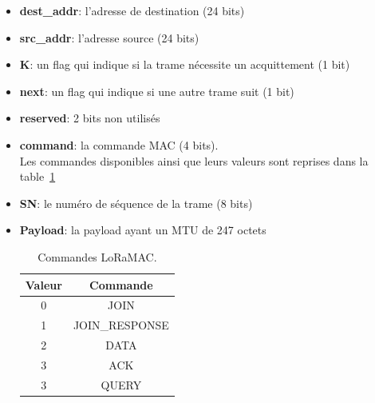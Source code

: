     \begin{itemize}
        \item \textbf{dest\_addr}: l'adresse de destination (24 bits)
        \item \textbf{src\_addr}: l'adresse source (24 bits)
        \item \textbf{K}: un flag  qui indique si la trame nécessite un acquittement (1 bit)
        \item \textbf{next}: un flag qui indique si une autre trame suit (1 bit)
        \item \textbf{reserved}: 2 bits non utilisés
        \item \textbf{command}: la commande MAC (4 bits).\\
        Les commandes disponibles ainsi que leurs valeurs sont reprises dans la table~\ref{tb:archi-loramac-command}
        \item \textbf{SN}: le numéro de séquence de la trame (8 bits)
        \item \textbf{Payload}: la payload ayant un MTU de 247 octets
        \begin{table}[H]
            \centering
            \begin{tabular}{|c|c|}
                \hline
                Valeur & Commande\\ \hline
                0 & JOIN\\ \hline
                1 & JOIN\_RESPONSE\\ \hline
                2 & DATA\\ \hline
                3 & ACK\\ \hline
                3 & QUERY\\ \hline
            \end{tabular}
            \caption{Commandes LoRaMAC.}
            \label{tb:archi-loramac-command}
        \end{table}
    \end{itemize}
